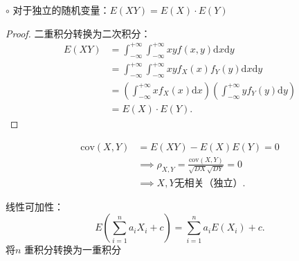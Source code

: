 $\circ$ 对于独立的随机变量：$E\left( XY \right) =E\left( X \right) \cdot E\left( Y \right) $
\begin{proof}
    二重积分转换为二次积分：
    \begin{align*}
        E\left( XY \right) &=\int_{-\infty}^{+\infty} \int_{-\infty}^{+\infty} xyf\left( x,y \right)  \mathrm{d}x \mathrm{d}y\\
        &= \int_{-\infty}^{+\infty} \int_{-\infty}^{+\infty} xyf_X\left( x \right) f_Y\left( y \right)  \mathrm{d}x \mathrm{d}y \\
        &= \left( \int_{-\infty}^{+\infty} xf_X\left( x \right)  \mathrm{d}x \right) \left( \int_{-\infty}^{+\infty} yf_Y\left( y \right)  \mathrm{d}y \right)  \\
        &= E\left( X \right) \cdot E\left( Y \right)
    .\end{align*}
\end{proof}
\begin{notation}
    \begin{align*}
        \text{cov}\left( X,Y \right) &=E\left( XY \right) -E\left( X \right) E\left( Y \right)=0\\
        &\implies \rho_{X,Y}=\frac{\text{cov}\left( X,Y \right) }{\sqrt{DX} \sqrt{DY} }=0\\
        &\implies X,Y\text{无相关（独立）}
    .\end{align*}
\end{notation}

 \begin{notation}
     线性可加性：\[
         E\left( \sum_{i=1}^{n} a_iX_i+c \right) =\sum_{i=1}^{n} a_iE\left( X_i \right) +c
     .\] 
     将$n$ 重积分转换为一重积分
 \end{notation}
